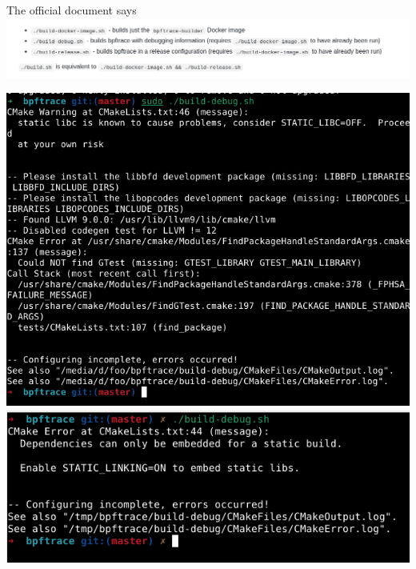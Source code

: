\documentclass{beamer}
\begin{document}
\begin{CJK*}{UTF8}{bsmi}
  \begin{frame}{The official document says}
    \includegraphics[width=\textwidth]{Screenshot_2021-08-06_06-50-18.png}
    \begin{multicols*}{2}
      \includegraphics[height=.6\textheight]{C86IdNH.png}
      \includegraphics[height=.6\textheight]{Screenshot_2021-08-06_07-00-24.png}
    \end{multicols*}

  \end{frame}


\end{CJK*}
\end{document}
